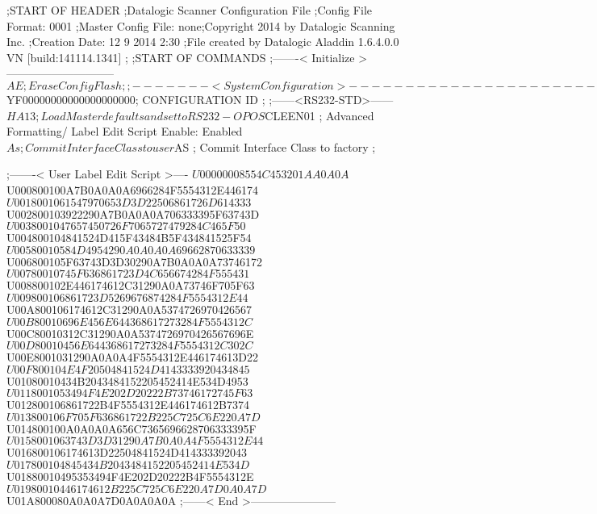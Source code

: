 ;START OF HEADER
;Datalogic Scanner Configuration File
;Config File Format: 0001
;Master Config File: none;Copyright 2014 by Datalogic Scanning Inc.
;Creation Date: 12 9 2014 2:30
;File created by Datalogic Aladdin 1.6.4.0.0 VN [build:141114.1341]
;
;START OF COMMANDS
;-------< Initialize >-----------------------------
$AE                 ; Erase Config Flash
;
;-------< System Configuration >-------------------------------
$YF00000000000000000000; CONFIGURATION ID
;
;------<RS232-STD>------
$HA13               ; Load Master defaults and set to RS232-OPOS
$CLEEN01            ; Advanced Formatting/ Label Edit Script Enable: Enabled
$As                 ; Commit Interface Class to user
$AS                 ; Commit Interface Class to factory
;

;-------< User Label Edit Script >----
$U00000008554C453201AA0A0A
$U000800100A7B0A0A0A6966284F5554312E446174
$U0018001061547970653D3D22506861726D614333
$U002800103922290A7B0A0A0A706333395F63743D
$U0038001047657450726F7065727479284C465F50
$U004800104841524D415F43484B5F434841525F54
$U00580010584D4954290A0A0A0A69662870633339
$U006800105F63743D3D30290A7B0A0A0A73746172
$U00780010745F636861723D4C656674284F555431
$U008800102E446174612C31290A0A73746F705F63
$U009800106861723D5269676874284F5554312E44
$U00A800106174612C31290A0A5374726970426567
$U00B80010696E456E644368617273284F5554312C
$U00C80010312C31290A0A5374726970426567696E
$U00D80010456E644368617273284F5554312C302C
$U00E8001031290A0A0A4F5554312E446174613D22
$U00F800104E4F20504841524D4143333920434845
$U01080010434B2043484152205452414E534D4953
$U0118001053494F4E202D20222B73746172745F63
$U012800106861722B4F5554312E446174612B7374
$U013800106F705F636861722B225C725C6E220A7D
$U014800100A0A0A0A656C7365696628706333395F
$U0158001063743D3D31290A7B0A0A4F5554312E44
$U016800106174613D22504841524D414333392043
$U017800104845434B2043484152205452414E534D
$U01880010495353494F4E202D20222B4F5554312E
$U01980010446174612B225C725C6E220A7D0A0A7D
$U01A800080A0A0A7D0A0A0A0A
;------< End >-----------------------
